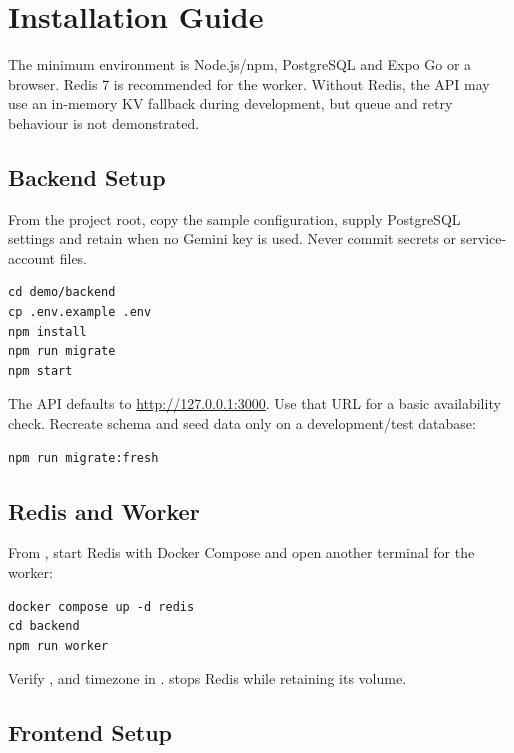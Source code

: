 \appendix
\startappendixpages

\chapter{Installation Guide}

The minimum environment is Node.js/npm, PostgreSQL and Expo Go or a browser. Redis 7 is recommended for the worker. Without Redis, the API may use an in-memory KV fallback during development, but queue and retry behaviour is not demonstrated.

\section{Backend Setup}

From the project root, copy the sample configuration, supply PostgreSQL settings and retain  when no Gemini key is used. Never commit secrets or service-account files.

\begin{verbatim}
cd demo/backend
cp .env.example .env
npm install
npm run migrate
npm start
\end{verbatim}

The API defaults to \url{http://127.0.0.1:3000}. Use that URL for a basic availability check. Recreate schema and seed data only on a development/test database:

\begin{verbatim}
npm run migrate:fresh
\end{verbatim}

\section{Redis and Worker}

From , start Redis with Docker Compose and open another terminal for the worker:

\begin{verbatim}
docker compose up -d redis
cd backend
npm run worker
\end{verbatim}

Verify ,  and timezone in .  stops Redis while retaining its volume.

\section{Frontend Setup}

